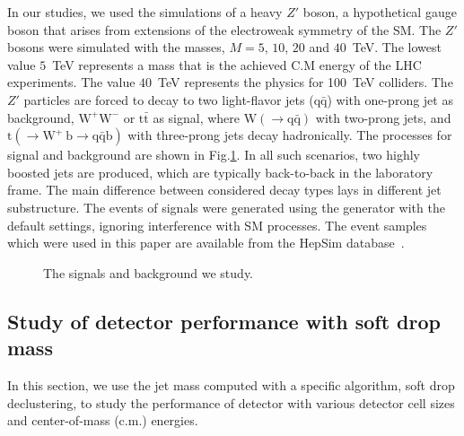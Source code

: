 \documentclass[12pt,twoside,a4paper,an,final]{cms-tdr}
\begin{document}
In our studies, we used the simulations of a heavy $Z'$ boson, a hypothetical gauge boson that arises from extensions of the electroweak symmetry of the SM.
The $Z'$ bosons were simulated with the masses, $M=5$, $10$, $20$ and $40$~TeV. The lowest value $5$~TeV represents a mass that is the achieved C.M energy of the LHC experiments. The value $40$~TeV represents the physics for 100~TeV colliders. The $Z'$ particles are forced to decay to two light-flavor jets ($\mathrm{q\bar{q}}$) with one-prong jet as background, $\mathrm{W^+W^-}$ or $\mathrm{t\bar{t}}$ as signal, where $\mathrm{W(\rightarrow q\bar{q})}$ with two-prong jets, and $\mathrm{t (\rightarrow  W^+\>b \rightarrow q\bar{q} b)}$ with three-prong jets decay hadronically. The processes for signal and background are shown in Fig.\ref{fig:Process_SB}. In all such scenarios, two highly boosted jets are produced, which are typically back-to-back in the laboratory frame. The main difference between considered decay types lays in different jet substructure. The events of signals were generated using the \pythia generator with the default settings, ignoring interference with SM processes. The event samples which were used in this paper are available from the HepSim database~\cite{Chekanov:2014fga}.

\begin{figure}
\begin{center}

\end{center}
\caption{The signals and background we study.}
\label{fig:Process_SB}
\end{figure}

\subsection{Study of detector performance with soft drop mass}
In this section, we use the jet mass computed with a specific algorithm, soft 
drop declustering, to study the performance of detector with various detector 
cell sizes and center-of-mass (c.m.) energies. 
\end{document}
